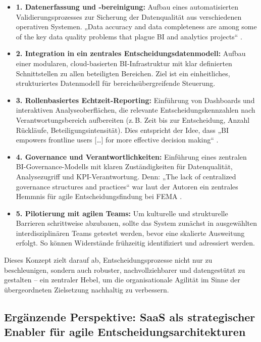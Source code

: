 \documentclass[12pt,a4paper]{article}
\begin{document}
	\begin{itemize}
		\item \textbf{1. Datenerfassung und -bereinigung:} Aufbau eines automatisierten Validierungsprozesses zur Sicherung der Datenqualität aus verschiedenen operativen Systemen. „Data accuracy and data completeness are among some of the key data quality problems that plague BI and analytics projects“ \parencite[S.~201]{smithAriyachandra2021}.
		
		\item \textbf{2. Integration in ein zentrales Entscheidungsdatenmodell:} Aufbau einer modularen, cloud-basierten BI-Infrastruktur mit klar definierten Schnittstellen zu allen beteiligten Bereichen. Ziel ist ein einheitliches, strukturiertes Datenmodell für bereichsübergreifende Steuerung.
		
		\item \textbf{3. Rollenbasiertes Echtzeit-Reporting:} Einführung von Dashboards und interaktiven Analyseoberflächen, die relevante Entscheidungskennzahlen nach Verantwortungsbereich aufbereiten (z.\,B. Zeit bis zur Entscheidung, Anzahl Rückläufe, Beteiligungsintensität). Dies entspricht der Idee, dass „BI empowers frontline users […] for more effective decision making“ \parencite[S.~201]{smithAriyachandra2021}.
		
		\item \textbf{4. Governance und Verantwortlichkeiten:} Einführung eines zentralen BI-Governance-Modells mit klaren Zuständigkeiten für Datenqualität, Analysezugriff und KPI-Verantwortung. Denn: „The lack of centralized governance structures and practices“ war laut der Autoren ein zentrales Hemmnis für agile Entscheidungsfindung bei FEMA \parencite[S.~208]{smithAriyachandra2021}.
		
		\item \textbf{5. Pilotierung mit agilen Teams:} Um kulturelle und strukturelle Barrieren schrittweise abzubauen, sollte das System zunächst in ausgewählten interdisziplinären Teams getestet werden, bevor eine skalierte Ausweitung erfolgt. So können Widerstände frühzeitig identifiziert und adressiert werden.
	\end{itemize}
	
	Dieses Konzept zielt darauf ab, Entscheidungsprozesse nicht nur zu beschleunigen, sondern auch robuster, nachvollziehbarer und datengestützt zu gestalten – ein zentraler Hebel, um die organisationale Agilität im Sinne der übergeordneten Zielsetzung nachhaltig zu verbessern.
\subsection{Ergänzende Perspektive: SaaS als strategischer Enabler für agile Entscheidungsarchitekturen}
\end{document}
